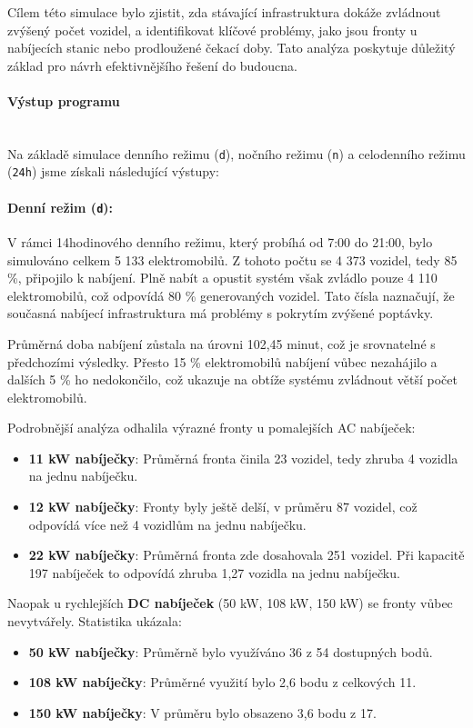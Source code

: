 \documentclass[a4paper,11pt]{article}
\begin{document}
Cílem této simulace bylo zjistit, zda stávající infrastruktura dokáže zvládnout zvýšený počet vozidel, a identifikovat klíčové problémy, jako jsou fronty u nabíjecích stanic nebo prodloužené čekací doby. Tato analýza poskytuje důležitý základ pro návrh efektivnějšího řešení do budoucna.


\paragraph{Výstup programu\\\\}
Na základě simulace denního režimu (\texttt{d}), nočního režimu (\texttt{n}) a celodenního režimu (\texttt{24h}) jsme získali následující výstupy:

\paragraph{Denní režim (\texttt{d}):} 
V rámci 14hodinového denního režimu, který probíhá od 7:00 do 21:00, bylo simulováno celkem 5 133 elektromobilů. Z tohoto počtu se 4 373 vozidel, tedy 85 \%, připojilo k nabíjení. Plně nabít a opustit systém však zvládlo pouze 4 110 elektromobilů, což odpovídá 80 \% generovaných vozidel. Tato čísla naznačují, že současná nabíjecí infrastruktura má problémy s pokrytím zvýšené poptávky.

Průměrná doba nabíjení zůstala na úrovni 102,45 minut, což je srovnatelné s předchozími výsledky. Přesto 15 \% elektromobilů nabíjení vůbec nezahájilo a dalších 5 \% ho nedokončilo, což ukazuje na obtíže systému zvládnout větší počet elektromobilů.

Podrobnější analýza odhalila výrazné fronty u pomalejších AC nabíječek:
\begin{itemize}
    \item \textbf{11 kW nabíječky}: Průměrná fronta činila 23 vozidel, tedy zhruba 4 vozidla na jednu nabíječku.
    \item \textbf{12 kW nabíječky}: Fronty byly ještě delší, v průměru 87 vozidel, což odpovídá více než 4 vozidlům na jednu nabíječku.
    \item \textbf{22 kW nabíječky}: Průměrná fronta zde dosahovala 251 vozidel. Při kapacitě 197 nabíječek to odpovídá zhruba 1,27 vozidla na jednu nabíječku.
\end{itemize}

Naopak u rychlejších \textbf{DC nabíječek} (50 kW, 108 kW, 150 kW) se fronty vůbec nevytvářely. Statistika ukázala:
\begin{itemize}
    \item \textbf{50 kW nabíječky}: Průměrně bylo využíváno 36 z 54 dostupných bodů.
    \item \textbf{108 kW nabíječky}: Průměrné využití bylo 2,6 bodu z celkových 11.
    \item \textbf{150 kW nabíječky}: V průměru bylo obsazeno 3,6 bodu z 17.
\end{itemize}
\end{document}

